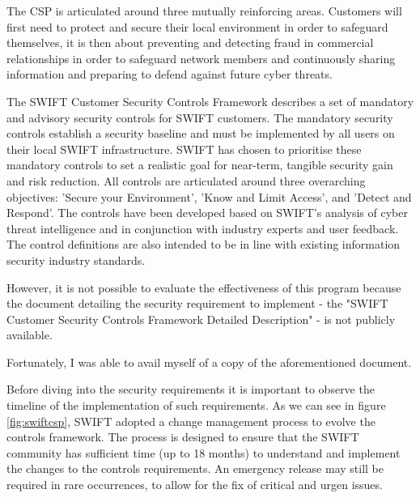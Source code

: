 \documentclass[12pt]{article}
\begin{document}
        The CSP is articulated around three mutually reinforcing areas. Customers will first need to protect and secure their local environment in order to safeguard themselves, it is then about preventing and detecting fraud in commercial relationships in order to safeguard network members and continuously sharing information and preparing to defend against future cyber threats.
        
        The SWIFT Customer Security Controls Framework describes a set of mandatory and advisory security controls for SWIFT customers. The mandatory security controls establish a security baseline and must be implemented by all users on their local SWIFT infrastructure. SWIFT has chosen to prioritise these mandatory controls to set a realistic goal for near-term, tangible security gain and risk reduction. 
        All controls are articulated around three overarching objectives: 'Secure your Environment', 'Know and Limit Access', and 'Detect and Respond'. The controls have been developed based on SWIFT's analysis of cyber threat intelligence and in conjunction with industry experts and user feedback. The control definitions are also intended to be in line with existing information security industry standards.
        
        However, it is not possible to evaluate the effectiveness of this program because the document detailing the security requirement to implement - the "SWIFT Customer Security Controls Framework Detailed Description" - is not publicly available. 
        
        Fortunately, I was able to avail myself of a copy of the aforementioned document.
        
        Before diving into the security requirements it is important to observe the timeline of the implementation of such requirements. As we can see in figure \ref{fig:swiftcsp}, SWIFT adopted a change management process to evolve the controls framework. The process is designed to ensure that the SWIFT community has sufficient time (up to 18 months) to understand and implement the changes to the controls requirements. An emergency release may still be required in rare occurrences, to allow for the fix of critical and urgen issues. 
        
\end{document}
